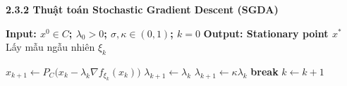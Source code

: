 \begin{frame}[shrink]{\textbf{\large 2.3.2 Thuật toán Stochastic Gradient Descent (SGDA)}}
\vspace*{-1cm}
\footnotesize
\begin{algorithm}[H]
\caption{(Stochastic Gradient Descent Algorithm-SGDA)}
\begin{algorithmic}[1]

\State \textbf{Input: $x^0 \in C$; $\lambda_0 > 0$; $\sigma, \kappa \in (0,1)$; $k=0$ }
\State \textbf{Output: Stationary point $x^*$}
    \State Lấy mẫu ngẫu nhiên $\xi_k$

    \State $   x_{k+1} \gets P_C\big(x_k - \lambda_k \nabla f_{\xi_k}(x_k)\big)  $
        \State
        $    \lambda_{k+1} \gets \lambda_k $
    \Else
        \State
        $
            \lambda_{k+1} \gets \kappa \lambda_k
        $
    \EndIf
        \State \textbf{break}
    \EndIf
    \State  $k \gets k + 1$
\EndWhile
\end{algorithmic}
\end{algorithm}
\end{frame}